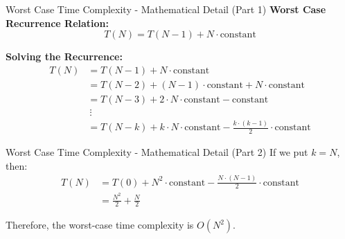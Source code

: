 \begin{frame}{Worst Case Time Complexity - Mathematical Detail (Part 1)}
    \textbf{Worst Case Recurrence Relation:}
    \[ T(N) = T(N - 1) + N \cdot \text{constant} \]

    \textbf{Solving the Recurrence:}
    \begin{align*}
        T(N) &= T(N - 1) + N \cdot \text{constant} \\
        &= T(N - 2) + (N - 1) \cdot \text{constant} + N \cdot \text{constant} \\
        &= T(N - 3) + 2 \cdot N \cdot \text{constant} - \text{constant} \\
        & \ \vdots \\
        &= T(N - k) + k \cdot N \cdot \text{constant} - \frac{k \cdot (k - 1)}{2} \cdot \text{constant}
    \end{align*}
\end{frame}

\begin{frame}{Worst Case Time Complexity - Mathematical Detail (Part 2)}
    If we put \(k = N\), then:
    \begin{align*}
        T(N) &= T(0) + N^2 \cdot \text{constant} - \frac{N \cdot (N-1)}{2} \cdot \text{constant} \\
        &= \frac{N^2}{2} + \frac{N}{2}
    \end{align*}

    Therefore, the worst-case time complexity is \(O(N^2)\).
\end{frame}



